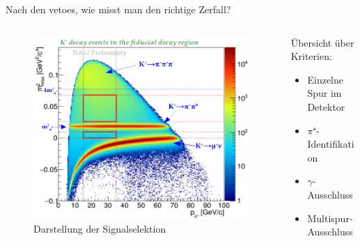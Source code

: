 \documentclass[aspectratio=1610, professionalfonts, 9pt, t]{beamer}
\begin{document}
  \begin{frame}{Nach den vetoes, wie misst man den richtige Zerfall?}
      \begin{columns}[onlytextwidth]
        \begin{column}{0.4\textwidth}
          \begin{figure}[ht]
            \begin{center}
              \includegraphics[height=0.8\textheight]{Images/na62decayregion.png} %
              \caption{Darstellung der Signalselektion}
            \end{center}
          \end{figure}
        \end{column}
        \begin{column}{0.5\textwidth}
          Übersicht über Kriterien:
          \begin{itemize}
            \item Einzelne Spur im Detektor
            \item $\pi⁺$-Identifikation
            \item $\gamma$-Ausschluss
            \item Multispur-Ausschluss
          \end{itemize}
        \end{column}
      \end{columns}
  \end{frame}
\end{document}
